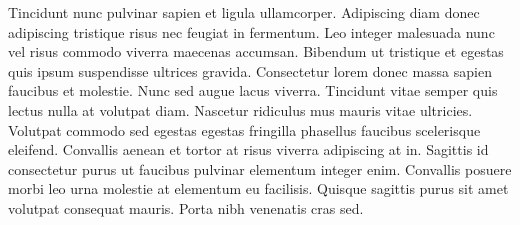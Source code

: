 Tincidunt nunc pulvinar sapien et ligula ullamcorper. Adipiscing diam donec adipiscing tristique risus nec feugiat in fermentum. Leo integer malesuada nunc vel risus commodo viverra maecenas accumsan. Bibendum ut tristique et egestas quis ipsum suspendisse ultrices gravida. Consectetur lorem donec massa sapien faucibus et molestie. Nunc sed augue lacus viverra. Tincidunt vitae semper quis lectus nulla at volutpat diam. Nascetur ridiculus mus mauris vitae ultricies. Volutpat commodo sed egestas egestas fringilla phasellus faucibus scelerisque eleifend. Convallis aenean et tortor at risus viverra adipiscing at in. Sagittis id consectetur purus ut faucibus pulvinar elementum integer enim. Convallis posuere morbi leo urna molestie at elementum eu facilisis. Quisque sagittis purus sit amet volutpat consequat mauris. Porta nibh venenatis cras sed.


